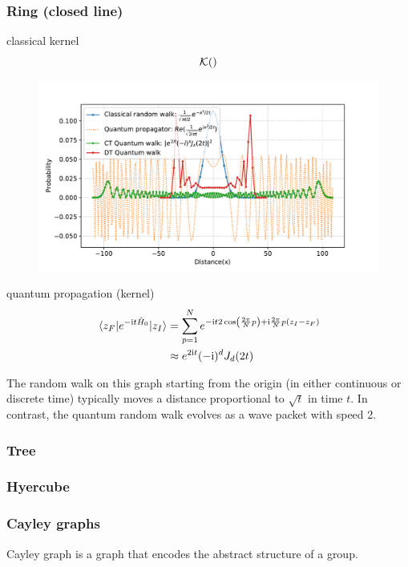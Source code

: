 \subsubsection{Ring (closed line)}
classical kernel 
\begin{equation}
	\mathcal{K}()
\end{equation}
\begin{figure}[!ht]
	\centering
	\includegraphics[width=.7\linewidth]{walk_propagator_1d.pdf}
	\caption{}
\end{figure}
quantum propagation (kernel)
\begin{align}
	\mel{z_F}{e^{-\textup{i}t\hat{H}_0 }}{z_I}
	&=\sum_{p=1}^{N} 
	e^{-\textup{i} t 2\cos(\frac{2\pi}{N}p) +\textup{i} \frac{2\pi}{N} p(z_I-z_F)} 
	\\
	&
	\approx e^{2\textup{i} t} (-\textup{i})^{d} J_{d} (2t)
	\label{eq:ctqrw_kernel}
\end{align}
\begin{remark}
    The random walk on this graph starting from the origin (in either continuous or discrete time)
    typically moves a distance proportional to $\sqrt{t}$ in time $t$.
	In contrast, the quantum random walk evolves as a wave packet with speed 2.
\end{remark}

\subsubsection{Tree}
\subsubsection{Hyercube}
\subsubsection{Cayley graphs}
\begin{definition}\label{def:cayley_graph}
	Cayley graph is a graph that encodes the abstract structure of a group. 
\end{definition}

